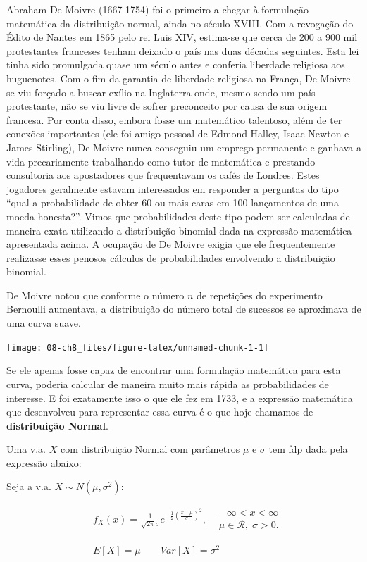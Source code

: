 \documentclass[
]{book}
\theoremstyle{definition}
\theoremstyle{definition}
\theoremstyle{definition}
\theoremstyle{remark}
\begin{document}
Abraham De Moivre (1667-1754) foi o primeiro a chegar à formulação matemática da distribuição normal, ainda no século XVIII. Com a revogação do Édito de Nantes em 1865 pelo rei Luis XIV, estima-se que cerca de 200 a 900 mil protestantes franceses tenham deixado o país nas duas décadas seguintes. Esta lei tinha sido promulgada quase um século antes e conferia liberdade religiosa aos huguenotes. Com o fim da garantia de liberdade religiosa na França, De Moivre se viu forçado a buscar exílio na Inglaterra onde, mesmo sendo um país protestante, não se viu livre de sofrer preconceito por causa de sua origem francesa. Por conta disso, embora fosse um matemático talentoso, além de ter conexões importantes (ele foi amigo pessoal de Edmond Halley, Isaac Newton e James Stirling), De Moivre nunca conseguiu um emprego permanente e ganhava a vida precariamente trabalhando como tutor de matemática e prestando consultoria aos apostadores que frequentavam os cafés de Londres. Estes jogadores geralmente estavam interessados em responder a perguntas do tipo ``qual a probabilidade de obter 60 ou mais caras em 100 lançamentos de uma moeda honesta?''. Vimos que probabilidades deste tipo podem ser calculadas de maneira exata utilizando a distribuição binomial dada na expressão matemática apresentada acima. A ocupação de De Moivre exigia que ele frequentemente realizasse esses penosos cálculos de probabilidades envolvendo a distribuição binomial.

De Moivre notou que conforme o número \(n\) de repetições do experimento Bernoulli aumentava, a distribuição do número total de sucessos se aproximava de uma curva suave.

\begin{center}\texttt{[image: 08-ch8\_files/figure-latex/unnamed-chunk-1-1]} \end{center}

Se ele apenas fosse capaz de encontrar uma formulação matemática para esta curva, poderia calcular de maneira muito mais rápida as probabilidades de interesse. E foi exatamente isso o que ele fez em 1733, e a expressão matemática que desenvolveu para representar essa curva é o que hoje chamamos de \textbf{distribuição Normal}.

Uma v.a. \(X\) com distribuição Normal com parâmetros \(\mu\) e \(\sigma\) tem fdp dada pela expressão abaixo:

Seja a v.a. \(X \sim N(\mu, \sigma^2)\):

\begin{align*}
  & f_{X}(x) =  \frac{1}{\sqrt{2\pi}\sigma} e^{-\frac{1}{2}\left(\frac{x-\mu}{\sigma}\right)^2}, \begin{array}{rl} & -\infty < x  < \infty\\
               & \mu \in \mathcal{R}, \; \sigma > 0.
  \end{array}
  \\ \\ \\
  & E[X] = \mu \qquad Var[X] = \sigma^2
\end{align*}
\end{document}
